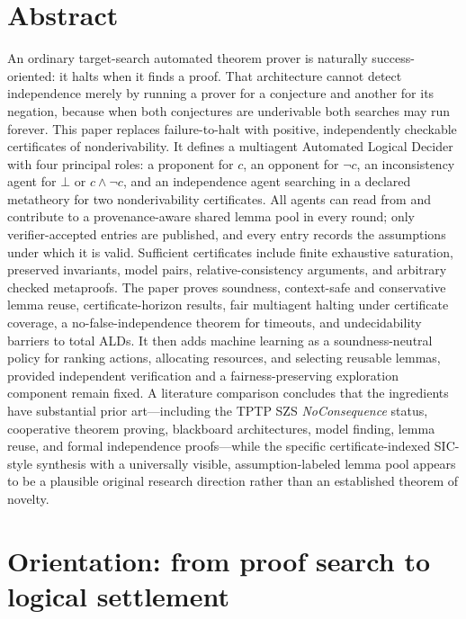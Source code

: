 \documentclass[11pt]{article}
\theoremstyle{definition}
\theoremstyle{remark}
\begin{document}
\section*{Abstract}
An ordinary target-search automated theorem prover is naturally success-oriented: it halts when it finds a proof. That architecture cannot detect independence merely by running a prover for a conjecture and another for its negation, because when both conjectures are underivable both searches may run forever. This paper replaces failure-to-halt with positive, independently checkable certificates of nonderivability. It defines a multiagent Automated Logical Decider with four principal roles: a proponent for $c$, an opponent for $\neg c$, an inconsistency agent for $\bot$ or $c\wedge\neg c$, and an independence agent searching in a declared metatheory for two nonderivability certificates. All agents can read from and contribute to a provenance-aware shared lemma pool in every round; only verifier-accepted entries are published, and every entry records the assumptions under which it is valid. Sufficient certificates include finite exhaustive saturation, preserved invariants, model pairs, relative-consistency arguments, and arbitrary checked metaproofs. The paper proves soundness, context-safe and conservative lemma reuse, certificate-horizon results, fair multiagent halting under certificate coverage, a no-false-independence theorem for timeouts, and undecidability barriers to total ALDs. It then adds machine learning as a soundness-neutral policy for ranking actions, allocating resources, and selecting reusable lemmas, provided independent verification and a fairness-preserving exploration component remain fixed. A literature comparison concludes that the ingredients have substantial prior art---including the TPTP SZS \emph{NoConsequence} status, cooperative theorem proving, blackboard architectures, model finding, lemma reuse, and formal independence proofs---while the specific certificate-indexed SIC-style synthesis with a universally visible, assumption-labeled lemma pool appears to be a plausible original research direction rather than an established theorem of novelty.

\tableofcontents
\clearpage
{}

\section{Orientation: from proof search to logical settlement}
\end{document}
